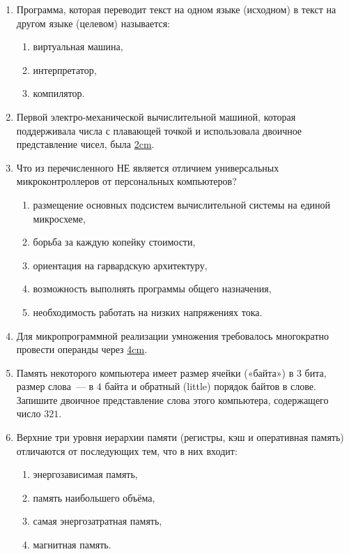 \begin{enumerate}
	\item Программа, которая переводит текст на одном языке (исходном) в текст на другом языке (целевом) называется:
	\begin{enumerate}
		\item виртуальная машина,
		\item интерпретатор,
		\item компилятор.
	\end{enumerate}

	\item Первой электро-механической вычислительной машиной, которая поддерживала числа с плавающей точкой и использовала двоичное представление чисел, была \uline{2cm}.

	\item Что из перечисленного НЕ является отличием универсальных микроконтроллеров от персональных компьютеров?
	\begin{enumerate}
		\item размещение основных подсистем вычислительной системы на единой микросхеме,
		\item борьба за каждую копейку стоимости,
		\item ориентация на гарвардскую архитектуру,
		\item возможность выполнять программы общего назначения,
		\item необходимость работать на низких напряжениях тока.
	\end{enumerate}

	\item Для микропрограммной реализации умножения требовалось многократно провести операнды через \uline{4cm}.

	\item Память некоторого компьютера имеет размер ячейки («байта») в $3$ бита, размер слова~— в $4$ байта и обратный (little) порядок байтов в слове. Запишите двоичное представление слова этого компьютера, содержащего число $321$.

	\item Верхние три уровня иерархии памяти (регистры, кэш и оперативная память) отличаются от последующих тем, что в них входит:
	\begin{enumerate}
		\item энергозависимая память,
		\item память наибольшего объёма,
		\item самая энергозатратная память,
		\item магнитная память.
	\end{enumerate}


\end{enumerate}
